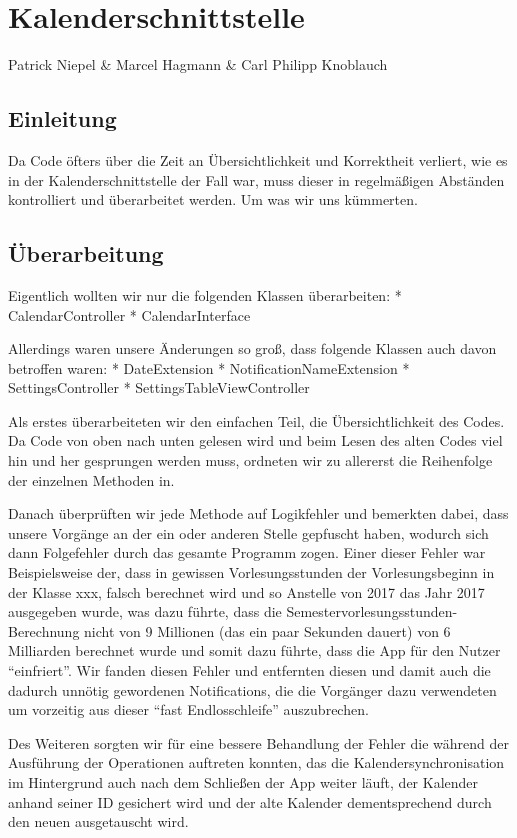 \chapter{Kalenderschnittstelle}
Patrick Niepel \& Marcel Hagmann \& Carl Philipp Knoblauch

\section{Einleitung}
Da Code öfters über die Zeit an Übersichtlichkeit und Korrektheit verliert, wie es in der Kalenderschnittstelle der Fall war, muss dieser in regelmäßigen Abständen kontrolliert und überarbeitet werden.
Um was wir uns kümmerten.

\section{Überarbeitung}
Eigentlich wollten wir nur die folgenden Klassen überarbeiten:
* CalendarController
* CalendarInterface

Allerdings waren unsere Änderungen so groß, dass folgende Klassen auch davon betroffen waren:
* DateExtension
* NotificationNameExtension
* SettingsController
* SettingsTableViewController

Als erstes überarbeiteten wir den einfachen Teil, die Übersichtlichkeit des Codes. Da Code von oben nach unten gelesen wird und beim Lesen des alten Codes viel hin und her gesprungen werden muss, ordneten wir zu allererst die Reihenfolge der einzelnen Methoden in.

Danach überprüften wir jede Methode auf Logikfehler und bemerkten dabei, dass unsere Vorgänge an der ein oder anderen Stelle gepfuscht haben, wodurch sich dann Folgefehler durch das gesamte Programm zogen.
Einer dieser Fehler war Beispielsweise der, dass in gewissen Vorlesungsstunden der Vorlesungsbeginn in der Klasse xxx, falsch berechnet wird und so Anstelle von 2017 das Jahr 2017 ausgegeben wurde, was dazu führte, dass die Semestervorlesungsstunden-Berechnung nicht von 9 Millionen (das ein paar Sekunden dauert) von 6 Milliarden berechnet wurde und somit dazu führte, dass die App für den Nutzer “einfriert”.
Wir fanden diesen Fehler und entfernten diesen und damit auch die dadurch unnötig gewordenen Notifications, die die Vorgänger dazu verwendeten um vorzeitig aus dieser “fast Endlosschleife” auszubrechen.

Des Weiteren sorgten wir für eine bessere Behandlung der Fehler die während der Ausführung der Operationen auftreten konnten, das die Kalendersynchronisation im Hintergrund auch nach dem Schließen der App weiter läuft, der Kalender anhand seiner ID gesichert wird und der alte Kalender dementsprechend durch den neuen ausgetauscht wird.
